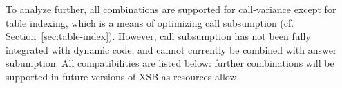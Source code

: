 To analyze further, all combinations are supported for call-variance
except for table indexing, which is a means of optimizing call
subsumption (cf. Section~\ref{sec:table-index}).
However, call subsumption has not been fully integrated with dynamic
code,
and cannot currently be combined
with answer subumption.
All compatibilities are listed below: further combinations will be
supported in future versions of XSB as resources allow.


